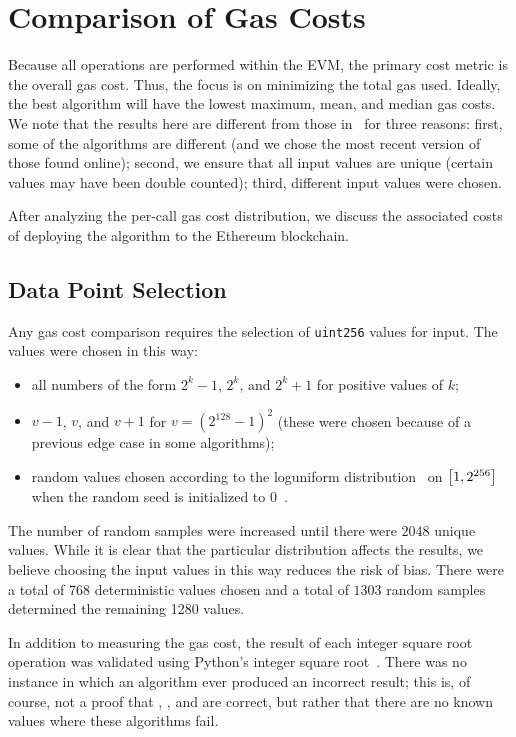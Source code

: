 \section{Comparison of Gas Costs}
\label{sec:comparison}

Because all operations are performed within the EVM,
the primary cost metric is the overall gas cost.
Thus, the focus is on minimizing the total gas used.
Ideally, the best algorithm will have the lowest maximum, mean, and median
gas costs.
We note that the results here are different from those
in~\cite{EfficientIsqrt} for three reasons:
first, some of the algorithms are different
(and we chose the most recent version of those found online);
second, we ensure that all input values are unique
(certain values may have been double counted);
third, different input values were chosen.

After analyzing the per-call gas cost distribution,
we discuss the associated costs of deploying the algorithm
to the Ethereum blockchain.


\subsection{Data Point Selection}

Any gas cost comparison requires the selection of \texttt{uint256}
values for input.
The values were chosen in this way:

\begin{itemize}
\item all numbers of the form $2^{k}-1$, $2^{k}$, and $2^{k}+1$
    for positive values of $k$;
\item $v-1$, $v$, and $v+1$ for $v = (2^{128}-1)^{2}$
    (these were chosen because of a previous edge case in some algorithms);
\item random values chosen according to the
    loguniform distribution~\cite{ScipyLoguniform}
    on $\left[ 1, 2^{256} \right]$ when the random seed
    is initialized to $0$~\cite{NumpyRandomSeed}.
\end{itemize}

\noindent
The number of random samples were increased until
there were $2048$ unique values.
While it is clear that the particular distribution affects the results,
we believe choosing the input values in this way reduces
the risk of bias.
There were a total of $768$ deterministic values chosen
and a total of $1303$ random samples determined
the remaining 1280 values.

In addition to measuring the gas cost,
the result of each integer square root operation was validated using
Python's integer square root~\cite{PythonIsqrt,PythonIsqrtLink}.
There was no instance in which an algorithm ever produced an incorrect result;
this is, of course, not a proof that 
\prb{}, \OpenZeppelin{}, and \abdk{} are correct,
but rather that there are no known values where these algorithms fail.


